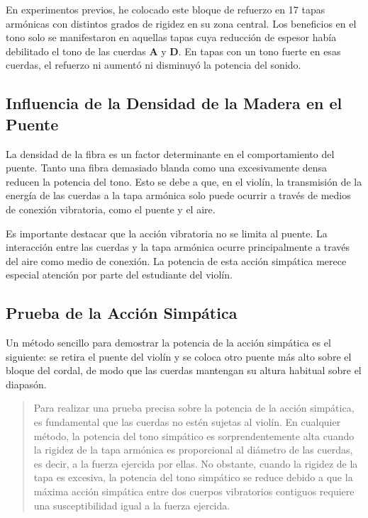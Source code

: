 \documentclass[12pt]{book}
\begin{document}
En experimentos previos, he colocado este bloque de refuerzo en 17 tapas armónicas con distintos grados de rigidez en su zona central. Los beneficios en el tono solo se manifestaron en aquellas tapas cuya reducción de espesor había debilitado el tono de las cuerdas \textbf{A} y \textbf{D}. En tapas con un tono fuerte en esas cuerdas, el refuerzo ni aumentó ni disminuyó la potencia del sonido.

\subsection*{Influencia de la Densidad de la Madera en el Puente}

La densidad de la fibra es un factor determinante en el comportamiento del puente. Tanto una fibra demasiado blanda como una excesivamente densa reducen la potencia del tono. Esto se debe a que, en el violín, la transmisión de la energía de las cuerdas a la tapa armónica solo puede ocurrir a través de medios de conexión vibratoria, como el puente y el aire. 

Es importante destacar que la acción vibratoria no se limita al puente. La interacción entre las cuerdas y la tapa armónica ocurre principalmente a través del aire como medio de conexión. La potencia de esta acción simpática merece especial atención por parte del estudiante del violín.

\subsection*{Prueba de la Acción Simpática}

Un método sencillo para demostrar la potencia de la acción simpática es el siguiente: se retira el puente del violín y se coloca otro puente más alto sobre el bloque del cordal, de modo que las cuerdas mantengan su altura habitual sobre el diapasón.

\begin{quote}
Para realizar una prueba precisa sobre la potencia de la acción simpática, es fundamental que las cuerdas no estén sujetas al violín. En cualquier método, la potencia del tono simpático es sorprendentemente alta cuando la rigidez de la tapa armónica es proporcional al diámetro de las cuerdas, es decir, a la fuerza ejercida por ellas. No obstante, cuando la rigidez de la tapa es excesiva, la potencia del tono simpático se reduce debido a que la máxima acción simpática entre dos cuerpos vibratorios contiguos requiere una susceptibilidad igual a la fuerza ejercida.
\end{quote}
\end{document}

